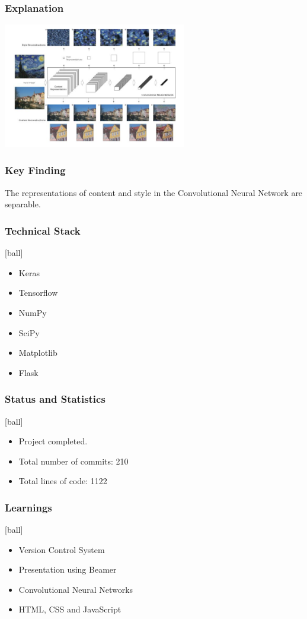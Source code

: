 \documentclass[14pt]{beamer}
\begin{document}
\begin{frame}
    \frametitle{Explanation}
    \begin{center}
        \includegraphics[width=80mm]{exp.jpg}
    \end{center}
\end{frame}

\begin{frame}
		\frametitle{Key Finding}
		The representations of content and style in the Convolutional Neural Network are separable.
\end{frame}

\begin{frame}
		\frametitle{Technical Stack}
		\begin{itemize}
		\item Keras 
        \item Tensorflow
		\item NumPy
		\item SciPy
        \item Matplotlib
		\item Flask  
		\end{itemize}
\end{frame}

\begin{frame}
		\frametitle{Status and Statistics}
		\begin{itemize}
		\item Project completed.
		\item Total number of commits: 210
        \item Total lines of code: 1122
		\end{itemize}
\end{frame}

\begin{frame}
		\frametitle{Learnings}
        \begin{itemize}
		\item Version Control System
		\item Presentation using Beamer
		\item Convolutional Neural Networks
        \item HTML, CSS and JavaScript
		\end{itemize}
\end{frame}
\end{document}
